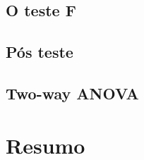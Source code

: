 \documentclass{beamer}
\begin{document}






\subsection{O teste F}

\subsection{Pós teste}

\subsection{Two-way ANOVA}

\section{Resumo}
\end{document}
